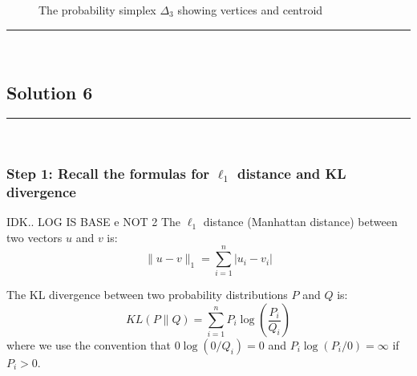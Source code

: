 \documentclass{article}
\begin{document}
\begin{figure}[h]
\caption{The probability simplex $\Delta_3$ showing vertices and centroid}
\end{figure}

\noindent\rule{\textwidth}{0.4pt}\\
\newpage

\subsection*{Solution 6}
\noindent\rule{\textwidth}{0.4pt}\\

\subsubsection*{Step 1: Recall the formulas for $\ell_1$ distance and KL divergence}
\parbox{\textwidth}{
    IDK.. LOG IS BASE e NOT 2
The $\ell_1$ distance (Manhattan distance) between two vectors $u$ and $v$ is:
$$\|u - v\|_1 = \sum_{i=1}^{n} |u_i - v_i|$$

The KL divergence between two probability distributions $P$ and $Q$ is:
$$KL(P \| Q) = \sum_{i=1}^{n} P_i \log\left(\frac{P_i}{Q_i}\right)$$
where we use the convention that $0 \log(0/Q_i) = 0$ and $P_i \log(P_i/0) = \infty$ if $P_i > 0$.
}
\end{document}
